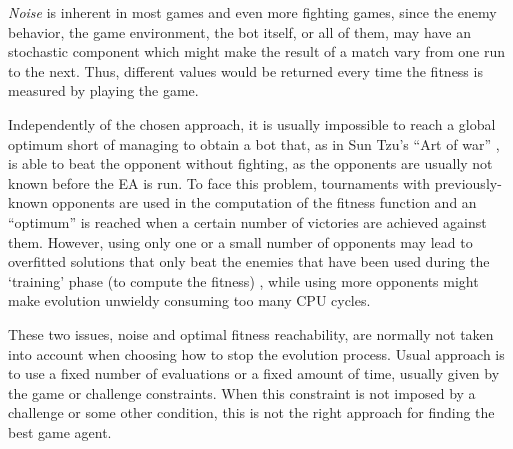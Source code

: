 \documentclass[runningheads,a4paper]{llncs}
\begin{document}
\textit{Noise} is inherent in most games and even more fighting games, since the enemy behavior, the game environment, the bot itself, or all of them, may have an
stochastic component which might make the result of a match vary from
one run to the next. Thus, different values would be returned
every time the fitness is measured by playing the game.

Independently of the chosen approach, it is usually impossible to reach a 
global optimum short of managing to obtain a bot that, as in Sun Tzu's ``Art of 
war'' %
, is able to beat the opponent without fighting, as the 
opponents are usually not known before the EA is run.
To face this problem, tournaments with previously-known opponents are used in 
the computation of the fitness function and an ``optimum'' is reached when a 
certain number of victories are achieved against them. However, using only one 
or a small number of opponents may lead to overfitted solutions that only beat 
the enemies that have been used during the `training' phase (to compute the 
fitness) \cite{DBLP:journals/jcst/MoraFGGF12}, while using more opponents might 
make evolution unwieldy consuming too many CPU cycles.

These two issues, noise and optimal fitness reachability, are normally not 
taken into account when choosing how to stop the evolution process. Usual 
approach is to use a fixed number of evaluations or a fixed amount of time, 
usually given by the game or challenge constraints. When this constraint is not 
imposed by a challenge or some other condition, this is not the right approach 
for finding the best game agent. %
\end{document}
